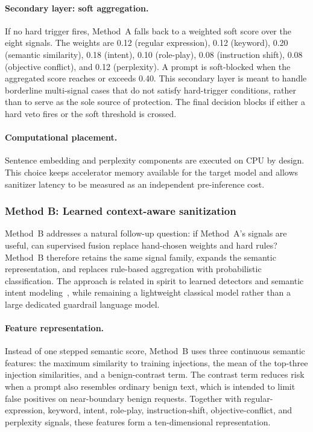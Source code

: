 \documentclass{article}
\begin{document}
\paragraph{Secondary layer: soft aggregation.}
If no hard trigger fires, Method~A falls back to a weighted soft score over the eight signals.
The weights are
0.12 (regular expression),
0.12 (keyword),
0.20 (semantic similarity),
0.18 (intent),
0.10 (role-play),
0.08 (instruction shift),
0.08 (objective conflict),
and 0.12 (perplexity).
A prompt is soft-blocked when the aggregated score reaches or exceeds 0.40.
This secondary layer is meant to handle borderline multi-signal cases that do not satisfy hard-trigger conditions, rather than to serve as the sole source of protection.
The final decision blocks if either a hard veto fires or the soft threshold is crossed.

\paragraph{Computational placement.}
Sentence embedding and perplexity components are executed on CPU by design.
This choice keeps accelerator memory available for the target model and allows sanitizer latency to be measured as an independent pre-inference cost.

\subsubsection{Method B: Learned context-aware sanitization}
\label{sec:method-b}

Method~B addresses a natural follow-up question: if Method~A's signals are useful, can supervised fusion replace hand-chosen weights and hard rules?
Method~B therefore retains the same signal family, expands the semantic representation, and replaces rule-based aggregation with probabilistic classification.
The approach is related in spirit to learned detectors and semantic intent modeling~\cite{wang2025promptsleuth,shi2025promptarmor}, while remaining a lightweight classical model rather than a large dedicated guardrail language model.

\paragraph{Feature representation.}
Instead of one stepped semantic score, Method~B uses three continuous semantic features: the maximum similarity to training injections, the mean of the top-three injection similarities, and a benign-contrast term.
The contrast term reduces risk when a prompt also resembles ordinary benign text, which is intended to limit false positives on near-boundary benign requests.
Together with regular-expression, keyword, intent, role-play, instruction-shift, objective-conflict, and perplexity signals, these features form a ten-dimensional representation.
\end{document}
